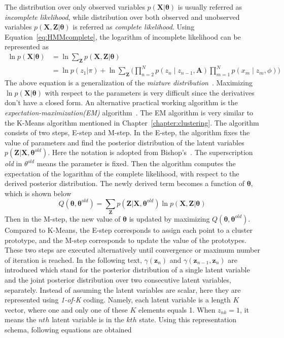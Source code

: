 The distribution over only observed variables \(p(\mathbf{X} | \boldsymbol{\theta})\) is usually referred as \textit{incomplete likelihood}, while distribution over both observed and unobserved variables \(p(\mathbf{X}, \mathbf{Z} | \boldsymbol{\theta})\) is referred as \textit{complete likelihood}. Using Equation~\ref{eq:HMMcomplete}, the logarithm of incomplete likelihood can be represented as
\begin{equation}
	\begin{split}
		\ln p(\mathbf{X} | \boldsymbol{\theta}) & = \ln \sum_{\mathbf{Z}}p(\mathbf{X}, \mathbf{Z} | \boldsymbol{\theta}) \\
										   & = \ln p(z_1 | \pi)  + \ln \sum_{\mathbf{Z}}\Big( \prod_{n=2}^{N}p(z_n\mid z_{n-1}, \mathbf{A}) \prod_{m=1}^{N}p(x_m\mid z_m, \phi)\Big)
	\end{split}
\end{equation}
The above equation is a generalization of the \textit{mixture distribution}~\cite{PRML}. Maximizing $\ln p(\mathbf{X} | \boldsymbol{\theta})$ with respect to the parameters is very difficult since the derivatives don't have a closed form. An alternative practical working algorithm is the \textit{expectation-maximization(EM)} algorithm~\cite{dempster1977maximum}\cite{mclachlan2007algorithm}. The EM algorithm is very similar to the K-Means algorithm mentioned in Chapter~\ref{chapter:clustering}. The algorithm consists of two steps, E-step and M-step. In the E-step, the algorithm fixes the value of parameters and find the posterior distribution of the latent variables \(p(\mathbf{Z} | \mathbf{X}, \boldsymbol{\theta}^{old})\). Here the notation is adopted from Bishop's~\cite{PRML}. The superscription \textit{old} in \(\theta^{old}\) means the parameter is fixed. Then the algorithm computes the expectation of the logarithm of the complete likelihood, with respect to the derived posterior distribution. The newly derived term becomes a function of \(\boldsymbol{\theta}\), which is shown below
\begin{equation}
	Q(\boldsymbol{\theta}, \boldsymbol{\theta}^{old}) = \sum_{\mathbf{Z}}p(\mathbf{Z}| \mathbf{X}, \boldsymbol{\theta}^{old})\ln p(\mathbf{X}, \mathbf{Z} | \boldsymbol{\theta})
\end{equation}
Then in the M-step,  the new value of \(\boldsymbol{\theta}\) is updated by maximizing \(Q(\boldsymbol{\theta}, \boldsymbol{\theta}^{old})\). Compared to K-Means, the E-step corresponds to assign each point to a cluster prototype, and the M-step corresponds to update the value of the prototypes. These two steps are executed alternatively until convergence or maximum number of iteration is reached. In the following text, \(\gamma(\mathbf{z}_n)\) and \(\gamma(\mathbf{z}_{n-1}, \mathbf{z}_n)\) are introduced which stand for the posterior distribution of a single latent variable and the joint posterior distribution over two consecutive latent variables, separately. Instead of assuming the latent variables are scalar, here they are represented using \textit{1-of-K} coding. Namely, each latent variable is a length \(K\) vector, where one and only one of these \(K\) elements equals 1. When \(z_{nk} = 1\), it means the \(nth\) latent variable is in the \(kth\) state. Using this representation schema, following equations are obtained
